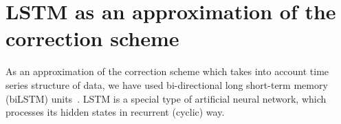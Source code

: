 \documentclass[aps,pra,showkeys,showpacs,notitlepage,superscriptaddress]{revtex4-1}
\newcommand{\1}{{\rm 1\hspace{-0.9mm}l}}
\begin{document}
%
\appendix

\section{LSTM as an approximation of the correction scheme}
\label{sec:LSTM}

As an approximation of the correction scheme which takes into account time 
series structure of data, we have used bi-directional long
short-term memory (biLSTM) units~\cite{hochreiter1997long}. LSTM is a special 
type of artificial neural network, which processes its hidden states in 
recurrent (cyclic) way.
\end{document}
